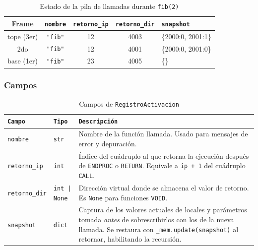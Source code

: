 \documentclass[12pt, letterpaper]{article}
\theoremstyle{definition}
\begin{document}
\begin{table}[H]
\centering
\caption{Estado de la pila de llamadas durante \texttt{fib(2)}}
\label{tab:pila-activacion}
\begin{tabular}{|c|c|c|c|p{4cm}|}
    \hline
    \textbf{Frame} & \texttt{nombre} & \texttt{retorno\_ip} & \texttt{retorno\_dir} & \texttt{snapshot} \\ \hline
    tope (3er) & \texttt{"fib"} & 12 & 4003 & \{2000:0, 2001:1\} \\ \hline
    2do        & \texttt{"fib"} & 12 & 4001 & \{2000:0, 2001:0\} \\ \hline
    base (1er) & \texttt{"fib"} & 23 & 4005 & \{\}              \\ \hline
\end{tabular}
\end{table}

\subsubsection*{Campos}

\begin{table}[H]
\centering
\caption{Campos de \texttt{RegistroActivacion}}
\label{tab:registro-activacion}
\begin{tabular}{|p{3.2cm}|p{2.8cm}|p{7cm}|}
    \hline
    \texttt{Campo} & \texttt{Tipo} & \texttt{Descripción} \\ \hline
    \texttt{nombre} & \texttt{str} &
    Nombre de la función llamada. Usado para mensajes de error y depuración. \\ \hline
    \texttt{retorno\_ip} & \texttt{int} &
    Índice del cuádruplo al que retorna la ejecución después de \texttt{ENDPROC} o \texttt{RETURN}. Equivale a \texttt{ip + 1} del cuádruplo \texttt{CALL}. \\ \hline
    \texttt{retorno\_dir} & \texttt{int | None} &
    Dirección virtual donde se almacena el valor de retorno. Es \texttt{None} para funciones \texttt{VOID}. \\ \hline
    \texttt{snapshot} & \texttt{dict} &
    Captura de los valores actuales de locales y parámetros tomada \emph{antes} de sobrescribirlos con los de la nueva llamada. Se restaura con \texttt{\_mem.update(snapshot)} al retornar, habilitando la recursión. \\ \hline
\end{tabular}
\end{table}

\end{document}
